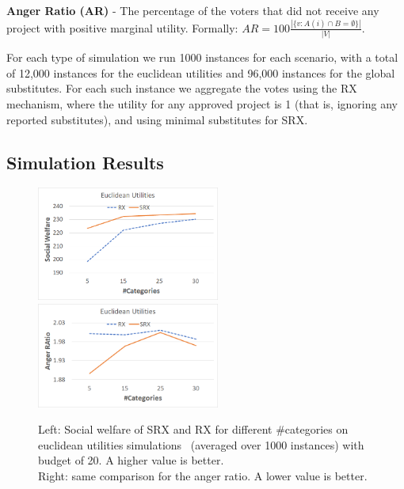 \documentclass[runningheads]{llncs}
\begin{document}
\textbf{Anger Ratio (AR)} - The percentage of the voters that did not receive any project with positive marginal utility. Formally: $AR=100\frac{|\{v:A(i)\cap B=\emptyset\}|}{|V|}$.

For each  type of simulation we run 1000 instances for each scenario, with a total of 12,000 instances for the euclidean utilities and 96,000 instances for the global substitutes. For each such instance we aggregate the votes using the RX mechanism, where the utility for any approved project is 1 (that is, ignoring any reported substitutes),  and using minimal substitutes for SRX.

\subsection{Simulation Results}




\begin{figure}[t]
\begin{center}
\includegraphics[width=6cm]{simulation/unit_cost_single_sw.png}
\includegraphics[width=6cm]{simulation/unit_cost_single_ar.png}
\caption{Left: Social welfare  of SRX and RX for different \#categories on euclidean utilities simulations~ (averaged over 1000 instances) with budget of 20. A higher value is better.\\
 Right: same comparison for the anger ratio. A lower value is better.
}\label{fig:type1}
\end{center}
\end{figure}
\end{document}
